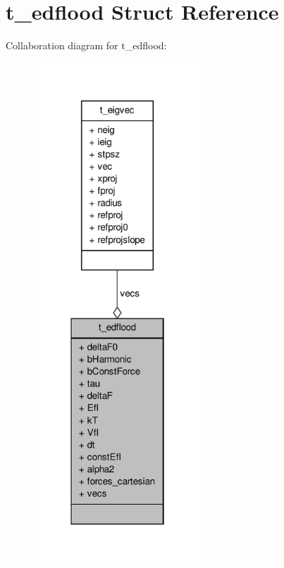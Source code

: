 \hypertarget{structt__edflood}{\section{t\-\_\-edflood \-Struct \-Reference}
\label{structt__edflood}
}


\-Collaboration diagram for t\-\_\-edflood\-:
\nopagebreak
\begin{figure}[H]
\begin{center}
\leavevmode
\includegraphics[width=178pt]{structt__edflood__coll__graph}
\end{center}
\end{figure}
